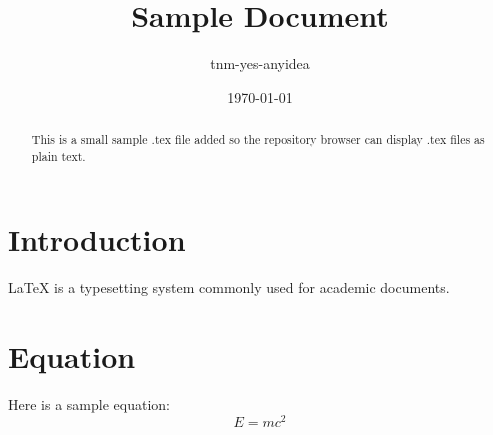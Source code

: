 \documentclass{article}
\title{Sample Document}
\author{tnm-yes-anyidea}
\date{\today}
\begin{document}
\maketitle
\begin{abstract}
This is a small sample .tex file added so the repository browser can display .tex files as plain text.
\end{abstract}

\section{Introduction}
LaTeX is a typesetting system commonly used for academic documents.

\section{Equation}
Here is a sample equation:
\[
E = mc^2
\]
\end{document}
